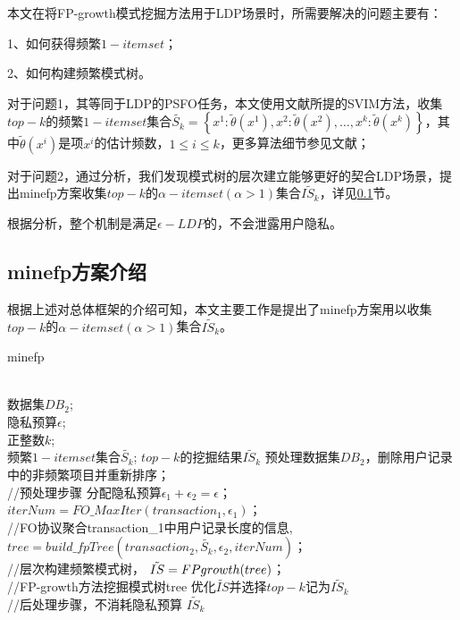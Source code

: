 \documentclass[UTF8]{ctexart}
\begin{document}
本文在将FP-growth模式挖掘方法用于LDP场景时，所需要解决的问题主要有：

1、如何获得频繁$1-itemset$；

2、如何构建频繁模式树。

对于问题1，其等同于LDP的PSFO任务，本文使用文献\cite{wang2018locally}所提的SVIM方法，收集$top-k$的频繁$1-itemset$集合$\tilde{S_k}=\left\{x^{1}: \tilde{\theta}(x^1), x^{2}: \tilde{\theta}(x^2), \ldots, x^{k}: \tilde{\theta}(x^k)\right\}$，其中$\tilde{\theta}(x^i)$是项$x^i$的估计频数，$1\leq i \leq k$，更多算法细节参见文献；

对于问题2，通过分析，我们发现模式树的层次建立能够更好的契合LDP场景，提出minefp方案收集$top-k$的$\alpha -itemset(\alpha>1)$集合$\tilde{IS_k}$，详见\ref{section:minefp}节。

根据分析，整个机制是满足$\epsilon-LDP$的，不会泄露用户隐私。

\subsection{minefp方案介绍}
\label{section:minefp}
根据上述对总体框架的介绍可知，本文主要工作是提出了minefp方案用以收集$top-k$的$\alpha -itemset(\alpha>1)$集合$\tilde{IS_k}$。

\begin{algorithm}[ht]
    \caption{minefp}
    \label{alg:minefp}
        \begin{algorithmic}[1]
			 \REQUIRE ~~\\
			 数据集$DB_2$;\\
			 隐私预算$\epsilon$;\\
			 正整数$k$;\\
			 频繁$1-itemset$集合$\tilde{S_k}$;
			 \ENSURE $top-k$的挖掘结果$\tilde{IS_k}$
                 \STATE 预处理数据集$DB_2$，删除用户记录中的非频繁项目并重新排序；\\//预处理步骤
                 \label{minefp:preprocessing} 
                 \STATE 分配隐私预算$\epsilon_1 + \epsilon_2 = \epsilon$；
                 \label{minefp:epsilon}            
			 \STATE $iterNum = FO\_MaxIter(transaction_1,\epsilon_1)$； \\ //FO协议聚合transaction\_1中用户记录长度的信息,%
			 \label{minefp:iterNum}
			 \STATE $tree = build\_fpTree(transaction_2,\tilde{S_k},\epsilon_2,iterNum)$； \\ //层次构建频繁模式树，%
			 \label{minefp:tree}
			 \STATE $\tilde{IS} = FP\-growth(tree)$； \\ //FP-growth方法挖掘模式树tree
                 \label{minefp:fpgrowth}
			 \STATE 优化$\tilde{IS}$并选择$top-k$记为$\tilde{IS_k}$ \\ //后处理步骤，不消耗隐私预算
                 \label{minefp:optimize}
                 \RETURN $\tilde{IS_k}$
        \end{algorithmic}
\end{algorithm}
\end{document}
